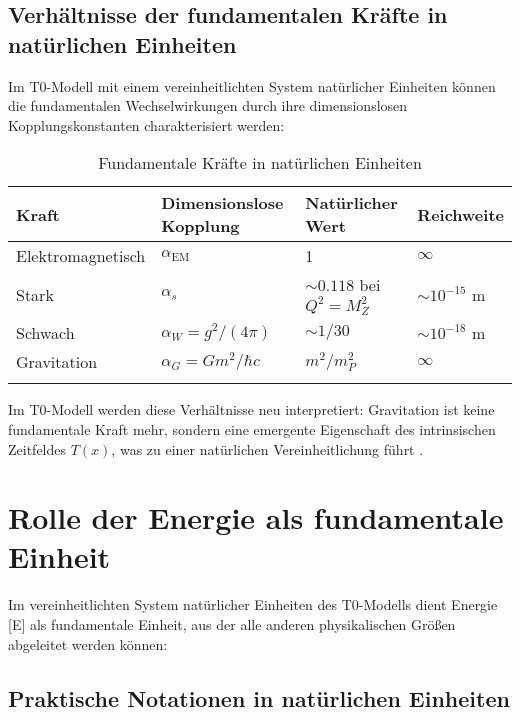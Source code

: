 \documentclass[12pt,a4paper]{article}
\newcommand{\Tfield}{T(x)}
\newcommand{\alphaEM}{\alpha_{\text{EM}}}
\begin{document}
	\subsection{Verhältnisse der fundamentalen Kräfte in natürlichen Einheiten}
	
	Im T0-Modell mit einem vereinheitlichten System natürlicher Einheiten können die fundamentalen Wechselwirkungen durch ihre dimensionslosen Kopplungskonstanten charakterisiert werden:
	
	\begin{table}[ht]
		\centering
		\begin{adjustbox}{scale=0.95}
			\begin{tabular}{llll}
				\hline
				\textbf{Kraft} & \textbf{Dimensionslose Kopplung} & \textbf{Natürlicher Wert} & \textbf{Reichweite} \\
				\hline
				Elektromagnetisch & $\alphaEM$ & 1 & $\infty$ \\
				Stark & $\alpha_s$ & $\sim 0.118$ bei $Q^2=M_Z^2$ & $\sim 10^{-15}$ m \\
				Schwach & $\alpha_W = g^2/(4\pi)$ & $\sim 1/30$ & $\sim 10^{-18}$ m \\
				Gravitation & $\alpha_G = Gm^2/\hbar c$ & $m^2/m_P^2$ & $\infty$ \\
				\hline
				\multicolumn{3}{c}{} \\
				\hline
			\end{tabular}
		\end{adjustbox}
		\caption{Fundamentale Kräfte in natürlichen Einheiten}
		\label{tab:forces}
	\end{table}
	
	Im T0-Modell werden diese Verhältnisse neu interpretiert: Gravitation ist keine fundamentale Kraft mehr, sondern eine emergente Eigenschaft des intrinsischen Zeitfeldes $\Tfield$, was zu einer natürlichen Vereinheitlichung führt \cite{pascher_grundkraefte_2025}.
	
	\section{Rolle der Energie als fundamentale Einheit}
	
	Im vereinheitlichten System natürlicher Einheiten des T0-Modells dient Energie [E] als fundamentale Einheit, aus der alle anderen physikalischen Größen abgeleitet werden können:
	
	\subsection{Praktische Notationen in natürlichen Einheiten}
	
\end{document}
